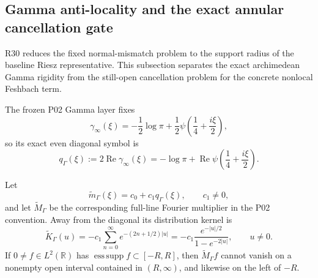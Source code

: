 
\subsection{Gamma anti-locality and the exact annular cancellation gate}
\label{subsec:o3ad-gamma-antilocality}

R30 reduces the fixed normal-mismatch problem to the support radius of the baseline
Riesz representative.  This subsection separates the exact archimedean Gamma rigidity
from the still-open cancellation problem for the concrete nonlocal Feshbach term.

The frozen P02 Gamma layer fixes
\[
 \gamma_\infty(\xi)
 =-\frac12\log\pi
 +\frac12\psi\!\left(\frac14+\frac{i\xi}{2}\right),
\]
so its exact even diagonal symbol is
\[
 \boxed{
 q_\Gamma(\xi)
 :=2\operatorname{Re}\gamma_\infty(\xi)
 =-\log\pi+\operatorname{Re}\psi\!\left(\frac14+\frac{i\xi}{2}\right).
 }
\tag{O3AD.1}\label{eq:o3ad-qgamma}
\]

\begin{proposition}
\label{prop:o3ad-gamma-antilocal}
Let
\[
 \widetilde m_\Gamma(\xi)=c_0+c_1q_\Gamma(\xi),
 \qquad c_1\ne0,
\]
and let \(\widetilde M_\Gamma\) be the corresponding full-line Fourier multiplier in
the P02 convention.  Away from the diagonal its distribution kernel is
\[
 \boxed{
 \widetilde K_\Gamma(u)
 =-c_1\sum_{n=0}^\infty e^{-(2n+1/2)|u|}
 =-c_1\frac{e^{-|u|/2}}{1-e^{-2|u|}},
 \qquad u\ne0.
 }
\tag{O3AD.2}\label{eq:o3ad-gamma-kernel}
\]
If \(0\ne f\in L^2(\mathbb R)\) has
\(\operatorname{ess\,supp}f\subset[-R,R]\), then
\(\widetilde M_\Gamma f\) cannot vanish on a nonempty open interval contained in
\((R,\infty)\), and likewise on the left of \(-R\).
\end{proposition}

